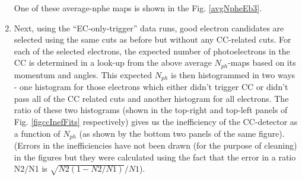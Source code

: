 \begin{enumerate}
One of these average-nphe maps is shown in the Fig. \ref{avgNpheEb3}.  %


\item Next, using the ``EC-only-trigger'' %
data runs, %
good electron candidates are selected using the same cuts as before but without any CC-related cuts. %
For each of the selected electrons, the expected number of photoelectrons in the CC %
is determined in a look-up from %
the above average $N_{ph}$-maps based on its momentum and angles. This expected $N_{ph}$ is then histogrammed in two ways - one histogram for those electrons which either didn't trigger CC or didn't pass all of the CC related cuts and another histogram for all %
 electrons. The ratio of these two histograms (shown in the top-right and top-left panels of Fig. \ref{figccInefFits} respectively) gives us the inefficiency of the CC-detector as a function of $N_{ph}$ (as shown by the bottom two panels of the same figure). (Errors in the inefficiencies have not been drawn (for the purpose of cleaning) %
 in the figures but they were calculated using the fact that the error in a ratio N2/N1 is $\sqrt{N2(1-N2/N1)}/N1$). %


\end{enumerate}

